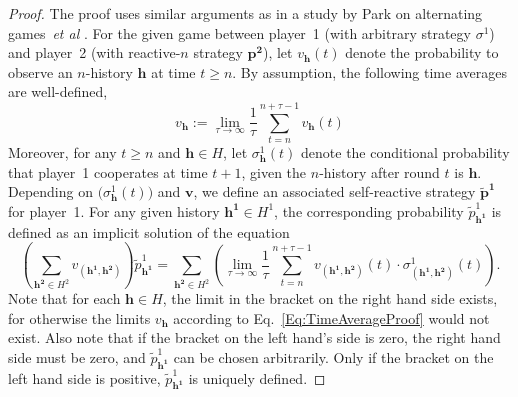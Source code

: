 \documentclass[11pt]{article}
\theoremstyle{plainCl1}
\theoremstyle{plainCl2}
\begin{document}
\begin{proof} 
The proof uses similar arguments as in a study by Park on alternating games~{\it et al} \citep{park:NComms:2022}. 
For the given game between player~1 (with arbitrary strategy $\sigma^1$) and player~2 (with reactive-$n$ strategy $\mathbf{p^2}$), let $v_\mathbf{h}(t)$ denote the probability to observe an $n$-history $\mathbf{h}$ at time $t\!\ge\!n$. 
By assumption, the following time averages are well-defined,
\begin{equation}\label{Eq:TimeAverageProof}
v_\mathbf{h}:=\lim_{\tau \to \infty} \frac{1}{\tau} \sum_{t=n}^{n+\tau-1} v_\mathbf{h}(t)
\end{equation}
Moreover, for any $t\!\ge\!n$ and $\mathbf{h}\!\in\! H$, let $\sigma^1_\mathbf{h}(t)$ denote the conditional probability that player~1 cooperates at time $t\!+\!1$, given the $n$-history after round $t$ is $\mathbf{h}$. Depending on $\big(\sigma^1_\mathbf{h}(t)\big)$ and $\mathbf{v}$, we define an associated self-reactive strategy $\mathbf{\tilde p^1}$ for player~1. For any given history $\mathbf{h^1} \!\in\! H^1$, the corresponding probability $\tilde p^1_\mathbf{h^1}$ is defined as an implicit solution of the equation
\begin{equation} \label{Eq:EquivalentSelfReactive}
\left( \sum_{\mathbf{h^2} \in H^2} v_{(\mathbf{h^1}, \mathbf{h^2})} \right) \tilde p^1_{\mathbf{h^1}}
=
 \sum_{\mathbf{h^2} \in H^2}
\left(\lim_{\tau \to \infty} \frac{1}{\tau} \sum_{t=n}^{n+\tau-1} v_{(\mathbf{h^1}, \mathbf{h^2})} (t)\cdot \sigma^1_{(\mathbf{h^1}, \mathbf{h^2})}(t)\right).
\end{equation}
Note that for each $\mathbf{h}\!\in\! H$, the limit in the bracket on the right hand side exists, for otherwise the limits $v_\mathbf{h}$ according to Eq.~\eqref{Eq:TimeAverageProof} would not exist. Also note that if the bracket on the left hand's side is zero, the right hand side must be zero, and $\tilde p^1_\mathbf{h^1}$ can be chosen arbitrarily. Only if the bracket on the left hand side is positive, $\tilde p^1_\mathbf{h^1}$ is uniquely defined. 


\end{proof}
\end{document}
